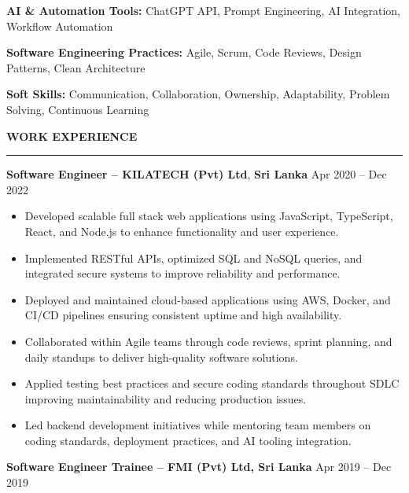 \documentclass[10pt,letterpaper]{article}
\begin{document}
\textbf{AI \& Automation Tools:} ChatGPT API, Prompt Engineering, AI Integration, Workflow Automation

\textbf{Software Engineering Practices:} Agile, Scrum, Code Reviews, Design Patterns, Clean Architecture

\textbf{Soft Skills:} Communication, Collaboration, Ownership, Adaptability, Problem Solving, Continuous Learning

\vspace{8pt}

\textbf{WORK EXPERIENCE}\\[-8pt]
\noindent\rule{\textwidth}{1pt}

\vspace{-2pt}

\textbf{Software Engineer -- KILATECH (Pvt) Ltd}, \textbf{Sri Lanka} \hfill Apr 2020 -- Dec 2022

\vspace{-1pt}

\begin{itemize}
\item Developed scalable full stack web applications using JavaScript, TypeScript, React, and Node.js to enhance functionality and user experience.
\item Implemented RESTful APIs, optimized SQL and NoSQL queries, and integrated secure systems to improve reliability and performance.
\item Deployed and maintained cloud-based applications using AWS, Docker, and CI/CD pipelines ensuring consistent uptime and high availability.
\item Collaborated within Agile teams through code reviews, sprint planning, and daily standups to deliver high-quality software solutions.
\item Applied testing best practices and secure coding standards throughout SDLC improving maintainability and reducing production issues.
\item Led backend development initiatives while mentoring team members on coding standards, deployment practices, and AI tooling integration.
\end{itemize}

\textbf{Software Engineer Trainee -- FMI (Pvt) Ltd, Sri Lanka} \hfill Apr 2019 -- Dec 2019

\vspace{-1pt}
\end{document}
